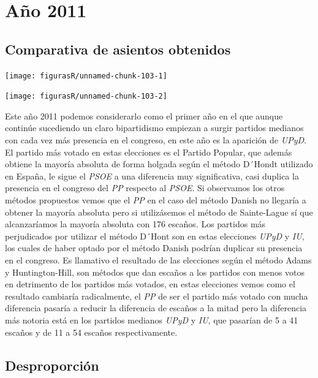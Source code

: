 \documentclass[12pt,a4paper,]{book}
\numberwithin{dummy}{section}
\theoremstyle{ocrenumbox}
\theoremstyle{blacknumex}
\theoremstyle{blacknumbox}
\theoremstyle{ocrenum}
\theoremstyle{ocrenum}
\begin{document}
\hypertarget{auxf1o-2011}{%
\section{Año 2011}\label{auxf1o-2011}}

\hypertarget{comparativa-de-asientos-obtenidos-10}{%
\subsection{Comparativa de asientos
obtenidos}\label{comparativa-de-asientos-obtenidos-10}}

\begin{center}\texttt{[image: figurasR/unnamed-chunk-103-1]} \end{center}

\begin{center}\texttt{[image: figurasR/unnamed-chunk-103-2]} \end{center}

Este año 2011 podemos considerarlo como el primer año en el que aunque
continúe sucediendo un claro bipartidismo empiezan a surgir partidos
medianos con cada vez más presencia en el congreso, en este año es la
aparición de \emph{UPyD}. El partido más votado en estas elecciones es
el Partido Popular, que además obtiene la mayoría absoluta de forma
holgada según el método D´Hondt utilizado en España, le sigue el
\emph{PSOE} a una diferencia muy significativa, casi duplica la
presencia en el congreso del \emph{PP} respecto al \emph{PSOE}. Si
observamos los otros métodos propuestos vemos que el \emph{PP} en el
caso del método Danish no llegaría a obtener la mayoría absoluta pero si
utilizásemos el método de Sainte-Lague sí que alcanzaríamos la mayoría
absoluta con 176 escaños. Los partidos más perjudicados por utilizar el
método D´Hont son en estas elecciones \emph{UPyD} y \emph{IU}, los
cuales de haber optado por el método Danish podrían duplicar su
presencia en el congreso. Es llamativo el resultado de las elecciones
según el método Adams y Huntington-Hill, son métodos que dan escaños a
los partidos con menos votos en detrimento de los partidos más votados,
en estas elecciones vemos como el resultado cambiaría radicalmente, el
\emph{PP} de ser el partido más votado con mucha diferencia pasaría a
reducir la diferencia de escaños a la mitad pero la diferencia más
notoria está en los partidos medianos \emph{UPyD} y \emph{IU}, que
pasarían de 5 a 41 escaños y de 11 a 54 escaños respectivamente.

\hypertarget{desproporciuxf3n-10}{%
\subsection{Desproporción}\label{desproporciuxf3n-10}}
\end{document}

